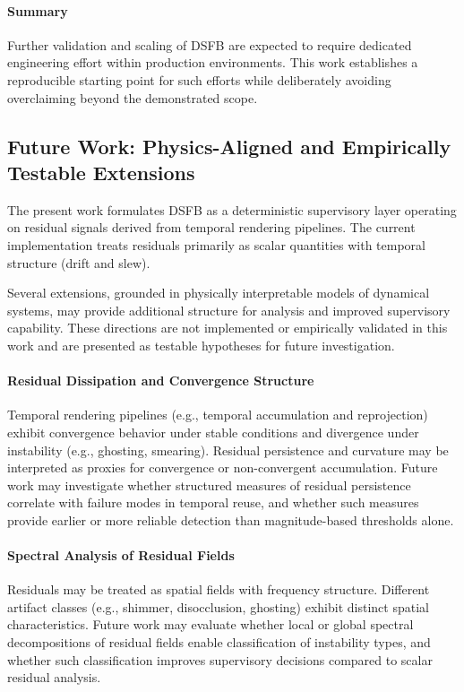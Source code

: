 \documentclass[11pt,letterpaper]{article}
\theoremstyle{gcresult}
\theoremstyle{definition}
\begin{document}
\paragraph{Summary}
Further validation and scaling of DSFB are expected to require dedicated engineering effort within production environments. This work establishes a reproducible starting point for such efforts while deliberately avoiding overclaiming beyond the demonstrated scope.

\subsection*{Future Work: Physics-Aligned and Empirically Testable Extensions}

The present work formulates DSFB as a deterministic supervisory layer operating on residual signals derived from temporal rendering pipelines. The current implementation treats residuals primarily as scalar quantities with temporal structure (drift and slew). 

Several extensions, grounded in physically interpretable models of dynamical systems, may provide additional structure for analysis and improved supervisory capability. These directions are not implemented or empirically validated in this work and are presented as testable hypotheses for future investigation.

\paragraph{Residual Dissipation and Convergence Structure}
Temporal rendering pipelines (e.g., temporal accumulation and reprojection) exhibit convergence behavior under stable conditions and divergence under instability (e.g., ghosting, smearing). Residual persistence and curvature may be interpreted as proxies for convergence or non-convergent accumulation. Future work may investigate whether structured measures of residual persistence correlate with failure modes in temporal reuse, and whether such measures provide earlier or more reliable detection than magnitude-based thresholds alone.

\paragraph{Spectral Analysis of Residual Fields}
Residuals may be treated as spatial fields with frequency structure. Different artifact classes (e.g., shimmer, disocclusion, ghosting) exhibit distinct spatial characteristics. Future work may evaluate whether local or global spectral decompositions of residual fields enable classification of instability types, and whether such classification improves supervisory decisions compared to scalar residual analysis.
\end{document}
